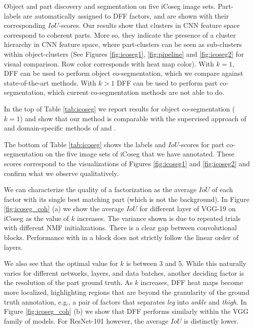 \documentclass[runningheads]{llncs}
\begin{document}
\begin{table}[t]
	\caption{Object and part discovery and segmentation on five iCoseg image sets. Part-labels are automatically assigned to DFF factors, and are shown with their corresponding $IoU$-scores. Our results show that clusters in CNN feature space correspond to coherent parts. More so, they indicate the presence of a cluster hierarchy in CNN feature space, where part-clusters can be seen as sub-clusters within object-clusters (See Figures \ref{fig:icoseg1}, \ref{fig:pipeline} and \ref{fig:icoseg2} for visual comparison. Row color corresponds with heat map color). With $k=1$, DFF can be used to perform object co-segmentation, which we compare against state-of-the-art methods. With $k>1$ DFF can be used to perform part co-segmentation, which current co-segmentation methods are not able to do.
	 } \label{tab:icoseg}
\end{table}



	In the top of Table \ref{tab:icoseg} we report results for object co-segmentation ($k=1$) and show that our method is comparable with the supervised approach of \cite{vicente2011object} and domain-specific methods of \cite{rubio2012unsupervised} and \cite{Rubinstein13Unsupervised}.

	The bottom of Table \ref{tab:icoseg} shows the labels and $IoU$-scores for part co-segmentation on the five image sets of iCoseg that we have annotated. These scores correspond to the visualizations of Figures \ref{fig:icoseg1} and \ref{fig:icoseg2} and confirm what we observe qualitatively.
	
	We can characterize the quality of a factorization as the average $IoU$ of each factor with its single best matching part (which is not the background). In Figure \ref{fig:icoseg_coh} (a) we show the average  $IoU$ for different layer of VGG-19 on iCoseg as the value of $k$ increases. The variance shown is due to repeated trials with different NMF initializations. There is a clear gap between convolutional blocks. Performance with in a block does not strictly follow the linear order of layers.
	
	We also see that the optimal value for $k$ is between 3 and 5. While this naturally varies for different networks, layers, and data batches, another deciding factor is the resolution of the part ground truth. As $k$ increases, DFF heat maps become more localized, highlighting regions that are beyond the granularity of the ground truth annotation, e.g., a pair of factors that separates \emph{leg} into \emph{ankle} and \emph{thigh}.
	In Figure \ref{fig:icoseg_coh} (b) we show that DFF performs similarly within the VGG family of models. For ResNet-101 however, the average $IoU$ is distinctly lower.
	
\end{document}
